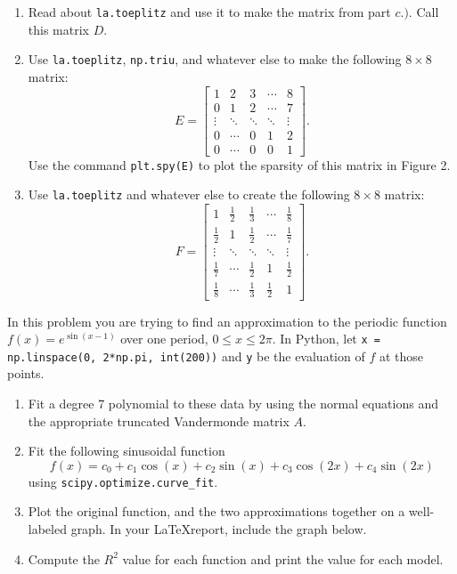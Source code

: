\documentclass[]{exam}
\numberwithin{equation}{section}
\begin{document}
\begin{questions}
\begin{enumerate}
\item[$d.)$] Read about \texttt{la.toeplitz} and use it to make the matrix from part $c.)$.  Call this matrix $D$.

\item[$e.)$] Use \texttt{la.toeplitz}, \texttt{np.triu}, and whatever else to make the following $8\times 8$ matrix:
\[\displaystyle E = \begin{bmatrix} 1 & 2 & 3 & \cdots & 8  \\ 
0  & 1 & 2 & \cdots & 7 \\ 
\vdots & \ddots & \ddots & \ddots & \vdots \\
0 &  \cdots & 0 & 1 & 2 \\
0 &  \cdots & 0 & 0 & 1\end{bmatrix}.\]
Use the command \texttt{plt.spy(E)} to plot the sparsity of this matrix in Figure 2.
 
\item[$f.)$] Use \texttt{la.toeplitz} and whatever else to create the following $8\times 8$ matrix:
\[\displaystyle F = \begin{bmatrix} 1 & \frac{1}{2} & \frac{1}{3} & \cdots & \frac{1}{8}  \\ 
\frac{1}{2}  & 1 & \frac{1}{2} & \cdots & \frac{1}{7} \\ 
\vdots & \ddots & \ddots & \ddots & \vdots \\
\frac{1}{7} &  \cdots & \frac{1}{2} & 1 & \frac{1}{2} \\
\frac{1}{8} &  \cdots & \frac{1}{3} & \frac{1}{2} & 1\end{bmatrix}.\]

\end{enumerate}

\pagebreak

\question In this problem you are trying to find an approximation to the periodic function $f(x) = e^{\sin(x-1)}$ over one period, $0\leq x \leq 2\pi$.  In Python, let \verb|x = np.linspace(0, 2*np.pi, int(200))| and \texttt{y} be the evaluation of $f$ at those points.
\begin{enumerate}
	\item[$a.)$] Fit a degree 7 polynomial to these data by using the normal equations and the appropriate truncated Vandermonde matrix $A$. 
	\item[$b.)$] Fit the following sinusoidal function 
		\[ f(x) = c_0 + c_1 \cos(x) + c_2 \sin(x) + c_3\cos(2x) + c_4\sin(2x) \]
		using \verb|scipy.optimize.curve_fit|.  
	\item[$c.)$] Plot the original function, and the two approximations together on a well-labeled graph. In your \LaTeX report, include the graph below. 
	\item[$d.)$] Compute the $R^2$ value for each function and print the value for each model.
\end{enumerate}




\end{questions}
\end{document}
